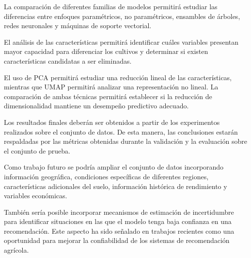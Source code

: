 \documentclass[conference]{IEEEtran}
\begin{document}
La comparación de diferentes familias de modelos permitirá estudiar las diferencias entre enfoques paramétricos, no paramétricos, ensambles de árboles, redes neuronales y máquinas de soporte vectorial.

El análisis de las características permitirá identificar cuáles variables presentan mayor capacidad para diferenciar los cultivos y determinar si existen características candidatas a ser eliminadas.

El uso de PCA permitirá estudiar una reducción lineal de las características, mientras que UMAP permitirá analizar una representación no lineal. La comparación de ambas técnicas permitirá establecer si la reducción de dimensionalidad mantiene un desempeño predictivo adecuado.

Los resultados finales deberán ser obtenidos a partir de los experimentos realizados sobre el conjunto de datos. De esta manera, las conclusiones estarán respaldadas por las métricas obtenidas durante la validación y la evaluación sobre el conjunto de prueba.

Como trabajo futuro se podría ampliar el conjunto de datos incorporando información geográfica, condiciones específicas de diferentes regiones, características adicionales del suelo, información histórica de rendimiento y variables económicas.

También sería posible incorporar mecanismos de estimación de incertidumbre para identificar situaciones en las que el modelo tenga baja confianza en una recomendación. Este aspecto ha sido señalado en trabajos recientes como una oportunidad para mejorar la confiabilidad de los sistemas de recomendación agrícola. \cite{alam2025}


\end{document}
